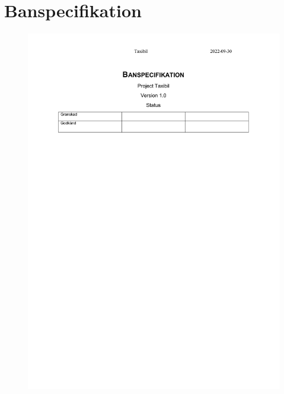 \documentclass[10pt,oneside,swedish]{lips}
\begin{document}
\section{Banspecifikation}
\label{appendix:banspec}
\begin{figure}[H]
    \centering
    \includegraphics[width=.95\textwidth]{Banspec.pdf}
\end{figure}
\end{document}
